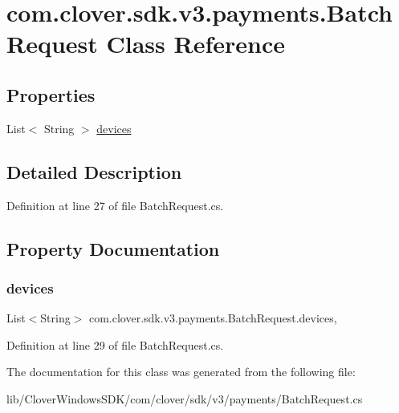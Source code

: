 \hypertarget{classcom_1_1clover_1_1sdk_1_1v3_1_1payments_1_1_batch_request}{}\section{com.\+clover.\+sdk.\+v3.\+payments.\+Batch\+Request Class Reference}
\label{classcom_1_1clover_1_1sdk_1_1v3_1_1payments_1_1_batch_request}
\subsection*{Properties}
\begin{DoxyCompactItemize}
\item 
List$<$ String $>$ \hyperlink{classcom_1_1clover_1_1sdk_1_1v3_1_1payments_1_1_batch_request_ad73f16031147ea6ecd12c231328f3700}{devices}
\end{DoxyCompactItemize}


\subsection{Detailed Description}


Definition at line 27 of file Batch\+Request.\+cs.



\subsection{Property Documentation}
\mbox{\label{classcom_1_1clover_1_1sdk_1_1v3_1_1payments_1_1_batch_request_ad73f16031147ea6ecd12c231328f3700}} 
\subsubsection{\texorpdfstring{devices}{devices}}
{\footnotesize\ttfamily List$<$String$>$ com.\+clover.\+sdk.\+v3.\+payments.\+Batch\+Request.\+devices\hspace{0.3cm}{\ttfamily [get]}, {\ttfamily [set]}}



Definition at line 29 of file Batch\+Request.\+cs.



The documentation for this class was generated from the following file\+:\begin{DoxyCompactItemize}
\item 
lib/\+Clover\+Windows\+S\+D\+K/com/clover/sdk/v3/payments/Batch\+Request.\+cs\end{DoxyCompactItemize}
